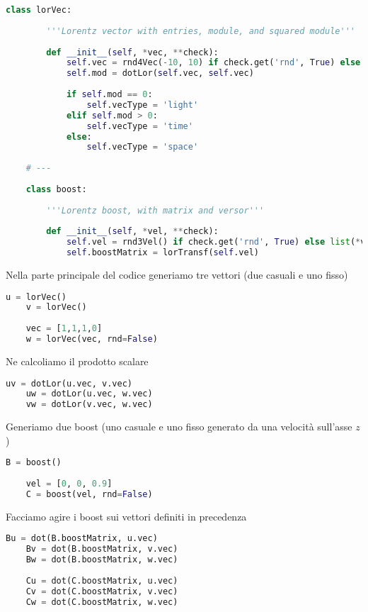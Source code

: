 \documentclass[12pt]{report}
\begin{document}
\begin{lstlisting}[language=Python]
	class lorVec:
	
		'''Lorentz vector with entries, module, and squared module'''
		
		def __init__(self, *vec, **check):
			self.vec = rnd4Vec(-10, 10) if check.get('rnd', True) else list(*vec)
			self.mod = dotLor(self.vec, self.vec)
		
			if self.mod == 0:
				self.vecType = 'light'
			elif self.mod > 0:
				self.vecType = 'time'
			else:
				self.vecType = 'space'
	
	# ---
	
	class boost:
	
		'''Lorentz boost, with matrix and versor'''
		
		def __init__(self, *vel, **check):
			self.vel = rnd3Vel() if check.get('rnd', True) else list(*vel)
			self.boostMatrix = lorTransf(self.vel)
\end{lstlisting}

Nella parte principale del codice generiamo tre vettori (due casuali e uno fisso)

\begin{lstlisting}[language=Python]
	u = lorVec()
	v = lorVec()
	
	vec = [1,1,1,0]
	w = lorVec(vec, rnd=False)
\end{lstlisting}

Ne calcoliamo il prodotto scalare

\begin{lstlisting}[language=Python]
	uv = dotLor(u.vec, v.vec)
	uw = dotLor(u.vec, w.vec)
	vw = dotLor(v.vec, w.vec)
\end{lstlisting}

Generiamo due boost (uno casuale e uno fisso generato da una velocità sull'asse $z$)

\begin{lstlisting}[language=Python]
	B = boost()
	
	vel = [0, 0, 0.9]
	C = boost(vel, rnd=False)
\end{lstlisting}

Facciamo agire i boost sui vettori definiti in precedenza

\begin{lstlisting}[language=Python]
	Bu = dot(B.boostMatrix, u.vec)
	Bv = dot(B.boostMatrix, v.vec)
	Bw = dot(B.boostMatrix, w.vec)
	
	Cu = dot(C.boostMatrix, u.vec)
	Cv = dot(C.boostMatrix, v.vec)
	Cw = dot(C.boostMatrix, w.vec)
\end{lstlisting}
\end{document}
